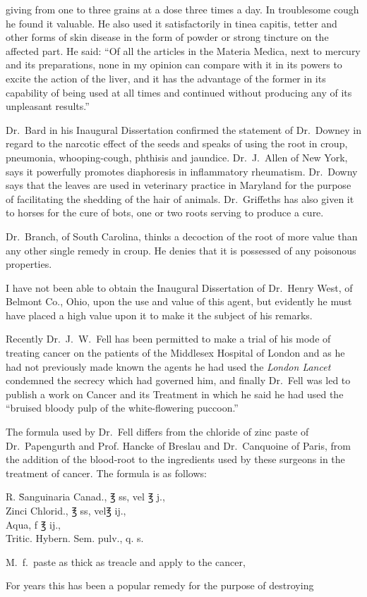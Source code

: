 giving from one to three grains at a dose three times a day. In
troublesome cough he found it valuable. He also used it satisfactorily
in tinea capitis, tetter and other forms of skin disease in the form of
powder or strong tincture on the affected part. He said: ``Of all
the articles in the Materia Medica, next to mercury and its preparations,
none in my opinion can compare with it in its powers to excite the
action of the liver, and it has the advantage of the former in its capability
of being used at all times and continued without producing any
of its unpleasant results.''

Dr.\ Bard in his Inaugural Dissertation confirmed the statement of
Dr.\ Downey in regard to the narcotic effect of the seeds and speaks
of using the root in croup, pneumonia, whooping-cough, phthisis and
jaundice. Dr.\ J.\ Allen of New York, says it powerfully promotes diaphoresis
in inflammatory rheumatism. Dr.\ Downy says that the leaves
are used in veterinary practice in Maryland for the purpose of facilitating
the shedding of the hair of animals. Dr.\ Griffeths has also given it to
horses for the cure of bots, one or two roots serving to produce a cure.

Dr.\ Branch, of South Carolina, thinks a decoction of the root of
more value than any other single remedy in croup. He denies that it
is possessed of any poisonous properties.

I have not been able to obtain the Inaugural Dissertation of Dr.\ Henry
West, of Belmont Co., Ohio, upon the use and value of this
agent, but evidently he must have placed a high value upon it to make
it the subject of his remarks.

Recently Dr.\ J.\ W.\ Fell has been permitted to make a trial of his
mode of treating cancer on the patients of the Middlesex Hospital of London
and as he had not previously made known the agents he had used
the \emph{London Lancet} condemned the secrecy which had governed him, and
finally Dr.\ Fell was led to publish a work on Cancer and its Treatment
in which he said he had used the ``bruised bloody pulp of the white-flowering
puccoon.''

The formula used by Dr.\ Fell differs from the chloride of zinc
paste of Dr.\ Papengurth and Prof. Hancke of Breslau and Dr.\ Canquoine
of Paris, from the addition of the blood-root to the ingredients used by
these surgeons in the treatment of cancer.   The formula is as follows:

\begin{center}
\begin{tabbing}
  \textsf{℞}. \= Sanguinaria Canad., \textsf{℥} ss, vel \textsf{℥} j., \\
    \> Zinci Chlorid., \textsf{℥} ss, vel\textsf{℥} ij., \\
    \> Aqua, f \textsf{℥} ij., \\
    \> Tritic. Hybern. Sem. pulv., q. s.
\end{tabbing}
\end{center}
M.\ f.\ paste as thick as treacle and apply to the cancer,

For years this has been a popular remedy for the purpose of destroying\endinput
